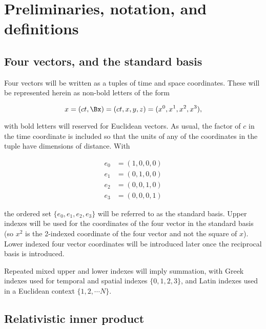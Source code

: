 
\section{Preliminaries, notation, and definitions}

\subsection{Four vectors, and the standard basis}

Four vectors will be written as a tuples of time and space coordinates.  These will be represented herein as non-bold letters of the form

\begin{equation}\label{eqn:grahamSchmidtLorentz:10}
x = (c t, \Bx) = ( c t, x, y, z ) = ( x^0, x^1, x^2, x^3 ),
\end{equation}

with bold letters will reserved for Euclidean vectors.  As usual, the factor of $c$ in the time coordinate is included so that the units of any of the coordinates in the tuple have dimensions of distance.  With

\begin{equation}\label{eqn:grahamSchmidtLorentz:70}
\begin{aligned}
e_0 &= (1, 0, 0, 0) \\
e_1 &= (0, 1, 0, 0) \\
e_2 &= (0, 0, 1, 0) \\
e_3 &= (0, 0, 0, 1)
\end{aligned}
\end{equation}

the ordered set $\{e_0, e_1, e_2, e_3\}$ will be referred to as the standard basis.  Upper indexes will be used for the coordinates of the four vector in the standard basis (so $x^2$ is the 2-indexed coordinate of the four vector and not the square of $x$).  Lower indexed four vector coordinates will be introduced later once the reciprocal basis is introduced.

Repeated mixed upper and lower indexes will imply summation, with Greek indexes used for temporal and spatial indexes $\{0, 1, 2, 3\}$, and Latin indexes used in a Euclidean context $\{1, 2, \cdots N\}$.

\subsection{Relativistic inner product}

